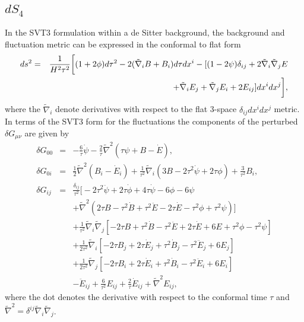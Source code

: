\subsection{$dS_4$}
\label{ss:ds4_svt3}
In the SVT3 formulation within a de Sitter background, the background and fluctuation metric can be expressed in the conformal to flat form
%
\begin{eqnarray}
ds^2 &=&\frac{1}{H^2\tau^2}\bigg{[}(1+2\phi) d\tau^2 -2(\tilde{\nabla}_i B +B_i)d\tau dx^i - [(1-2\psi)\delta_{ij} +2\tilde{\nabla}_i\tilde{\nabla}_j E 
\nonumber\\
&&+ \tilde{\nabla}_i E_j + \tilde{\nabla}_j E_i + 2E_{ij}]dx^i dx^j\bigg{]},
\label{7.1}
\end{eqnarray}
%
where the $\tilde{\nabla}_{i}$ denote derivatives with respect to the flat 3-space $\delta_{ij}dx^idx^j$ metric.
In terms of the SVT3 form for the fluctuations the components of the perturbed $\delta G_{\mu\nu}$ are given by \cite{amarasinghe_2019}
%
\begin{eqnarray}
\delta G_{00}&=&-\frac{6}{\tau}\dot{\psi}-\frac{2}{\tau}\tilde{\nabla}^2(\tau \psi +B-\dot{E}),
\nonumber\\
\delta G_{0i}&=&\frac{1}{2}\tilde{\nabla}^2(B_i-\dot{E}_i)+\frac{1}{\tau^2}\tilde{\nabla}_i(3B-2\tau^2\dot{\psi}+2\tau \phi)+\frac{3}{\tau^2}B_i,
\nonumber\\
\delta G_{ij}&=&\frac{\delta_{ij}}{\tau^2}\bigg[-2\tau^2\ddot{\psi}+2\tau\dot{\phi}+4\tau\dot{\psi}-6\phi-6\psi
\nonumber\\
&&+\tilde{\nabla}^2\left(2\tau B-\tau^2\dot{B}+\tau^2\ddot{E}-2\tau\dot{E}-\tau^2\phi+\tau^2\psi\right)\bigg]
\nonumber\\
&&+\frac{1}{\tau^2}\tilde{\nabla}_i\tilde{\nabla}_j\left[-2\tau B +\tau^2\dot{B}-\tau^2\ddot{E}+2\tau\dot{E}+6E+\tau^2\phi-\tau^2\psi\right]
\nonumber\\
&&+\frac{1}{2\tau^2}\tilde{\nabla}_i\left[-2\tau B_j+2\tau\dot{E}_j+\tau^2\dot{B}_j-\tau^2\ddot{E}_j+6E_j\right]
\nonumber\\
&&+\frac{1}{2\tau^2}\tilde{\nabla}_j\left[-2\tau B_i+2\tau\dot{E}_i+\tau^2\dot{B}_i-\tau^2\ddot{E}_i+6E_i\right]
\nonumber\\
&&-\ddot{E}_{ij}+\frac{6}{\tau^2}E_{ij}+\frac{2}{\tau}\dot{E}_{ij}+\tilde{\nabla}^2E_{ij},
\label{7.2}
\end{eqnarray}
%
where the dot denotes the derivative with respect to the conformal time $\tau$ and $\tilde{\nabla}^2=\delta^{ij}\tilde{\nabla}_i\tilde{\nabla}_j$. 
